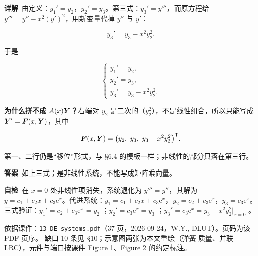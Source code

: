 \documentclass[11pt]{ctexart}
\begin{document}
\textbf{详解}\ 由定义：$y_1'=y_2$，$y_2'=y_3$。第三式：$y_3'=y'''$，而原方程给 $y'''=y''-x^2(y')^2$，用新变量代掉 $y''$ 与 $y'$：

\[
y_3'=y_3-x^2y_2^2 .
\]

于是

\[
\begin{cases}
y_1'=y_2,\\[3pt]
y_2'=y_3,\\[3pt]
y_3'=y_3-x^2y_2^2 .
\end{cases}
\]

\textbf{为什么拼不成 $A(x)\boldsymbol{Y}$？}右端对 $y_2$ 是二次的（$y_2^2$），不是线性组合，所以只能写成 $\boldsymbol{Y}'=\boldsymbol{F}(x,\boldsymbol{Y})$，其中

\[
\vect{F}(x,\vect{Y})=\bigl(y_2,\ y_3,\ y_3-x^2y_2^2\bigr)^{\mathsf T}.
\]

第一、二行仍是“移位”形式，与 §6.4 的模板一样；非线性的部分只落在第三行。

\textbf{答案}\ 如上三式；是非线性系统，不能写成矩阵乘向量。

\textbf{自检}\ 在 $x=0$ 处非线性项消失，系统退化为 $y'''=y''$，其解为 $y=c_1+c_2x+c_3\mathrm{e}^{x}$。代进系统：$y_1=c_1+c_2x+c_3\mathrm{e}^x$，$y_2=c_2+c_3\mathrm{e}^x$，$y_3=c_3\mathrm{e}^x$。三式验证：$y_1'=c_2+c_3\mathrm{e}^x=y_2$ ；$y_2'=c_3\mathrm{e}^x=y_3$ ；$y_3'=c_3\mathrm{e}^x=y_3-x^2y_2^2\big|_{x=0}$ 。

\flowerrule

{\small\color{inkgray}
依据课件：\texttt{13\_DE\_systems.pdf}（37 页，2026-09-24，W.Y., DLUT）。页码为该 PDF 页序。
缺口 10 条见 §10；示意图两张为本文重绘（弹簧-质量、并联 LRC），元件与端口按课件 Figure 1、Figure 2 的约定标注。}
\end{document}
